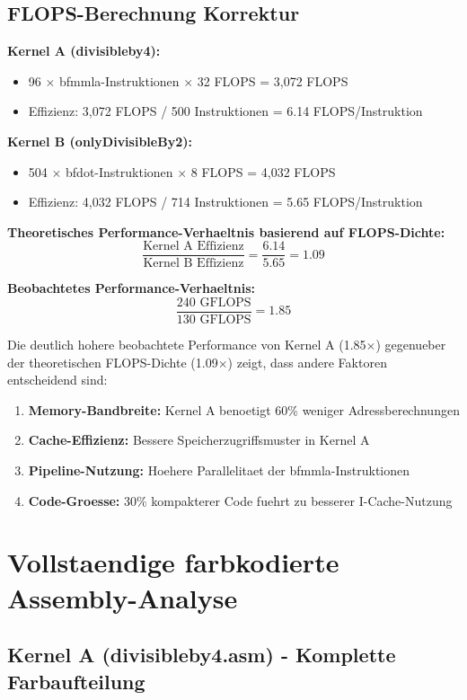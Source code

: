 \documentclass[11pt,a4paper]{article}
\begin{document}
\subsection{FLOPS-Berechnung Korrektur}

\textbf{Kernel A (divisibleby4):}
\begin{itemize}
\item 96 $\times$ bfmmla-Instruktionen $\times$ 32 FLOPS = 3,072 FLOPS
\item Effizienz: 3,072 FLOPS / 500 Instruktionen = 6.14 FLOPS/Instruktion
\end{itemize}

\textbf{Kernel B (onlyDivisibleBy2):}
\begin{itemize}
\item 504 $\times$ bfdot-Instruktionen $\times$ 8 FLOPS = 4,032 FLOPS  
\item Effizienz: 4,032 FLOPS / 714 Instruktionen = 5.65 FLOPS/Instruktion
\end{itemize}

\textbf{Theoretisches Performance-Verhaeltnis basierend auf FLOPS-Dichte:}
$$\frac{\text{Kernel A Effizienz}}{\text{Kernel B Effizienz}} = \frac{6.14}{5.65} = 1.09$$

\textbf{Beobachtetes Performance-Verhaeltnis:}
$$\frac{240 \text{ GFLOPS}}{130 \text{ GFLOPS}} = 1.85$$

Die deutlich hohere beobachtete Performance von Kernel A (1.85$\times$) gegenueber der theoretischen FLOPS-Dichte (1.09$\times$) zeigt, dass andere Faktoren entscheidend sind:
\begin{enumerate}
\item \textbf{Memory-Bandbreite:} Kernel A benoetigt 60\% weniger Adressberechnungen
\item \textbf{Cache-Effizienz:} Bessere Speicherzugriffsmuster in Kernel A
\item \textbf{Pipeline-Nutzung:} Hoehere Parallelitaet der bfmmla-Instruktionen
\item \textbf{Code-Groesse:} 30\% kompakterer Code fuehrt zu besserer I-Cache-Nutzung
\end{enumerate}

\section{Vollstaendige farbkodierte Assembly-Analyse}

\subsection{Kernel A (divisibleby4.asm) - Komplette Farbaufteilung}
\end{document}
